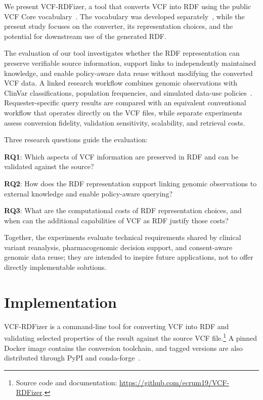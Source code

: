 \documentclass[pdflatex,sn-mathphys-num]{sn-jnl}
\begin{document}
We present VCF-RDFizer, a tool that converts VCF into RDF using the public VCF Core vocabulary~\cite{vcfc210}.
The vocabulary was developed separately~\cite{crum_vcfcore_2027}, while the present study focuses on the converter, its representation choices, and the potential for downstream use of the generated RDF.

The evaluation of our tool investigates whether the RDF representation can preserve verifiable source information, support links to independently maintained knowledge, and enable policy-aware data reuse without modifying the converted VCF data.
A linked research workflow combines genomic observations with ClinVar classifications, population frequencies, and simulated data-use policies~\cite{landrum2018clinvar}.
Requester-specific query results are compared with an equivalent conventional workflow that operates directly on the VCF files, while separate experiments assess conversion fidelity, validation sensitivity, scalability, and retrieval costs.

Three research questions guide the evaluation:

\textbf{RQ1}: Which aspects of VCF information are preserved in RDF and can be validated against the source?

\textbf{RQ2}: How does the RDF representation support linking genomic observations to external knowledge and enable policy-aware querying?

\textbf{RQ3}: What are the computational costs of RDF representation choices, and when can the additional capabilities of VCF as RDF justify those costs?

Together, the experiments evaluate technical requirements shared by clinical variant reanalysis, pharmacogenomic decision support, and consent-aware genomic data reuse; they are intended to inspire future applications, not to offer directly implementable solutions.


\section{Implementation}\label{sec:implementation}
VCF-RDFizer is a command-line tool for converting VCF into RDF and validating selected properties of the result against the source VCF file.\footnote{Source code and documentation: \url{https://github.com/ecrum19/VCF-RDFizer}.}
A pinned Docker image contains the conversion toolchain, and tagged versions are also distributed through PyPI and conda-forge~\cite{vcfrdfizer_docker,vcfrdfizer_pypi,vcfrdfizer_conda}.
\end{document}
